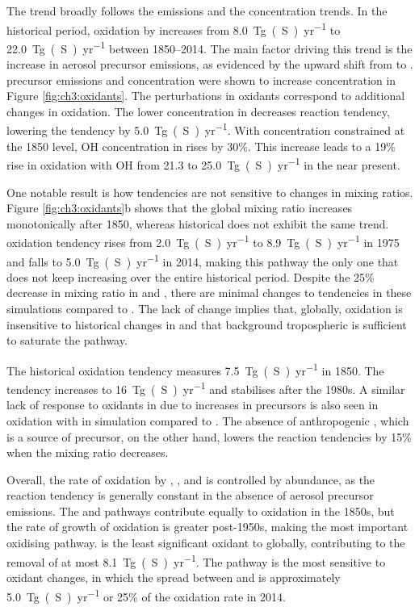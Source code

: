 The  trend broadly follows the  emissions and the  concentration trends. In the historical period,  oxidation by  increases from \qty{8.0}{Tg(S)~yr^{-1}} to \qty{22.0}{Tg(S)~yr^{-1}} between 1850--2014. The main factor driving this trend is the increase in aerosol precursor emissions, as evidenced by the upward shift from \sstpiaer{} to \histsst{}.  precursor emissions and  concentration were shown to increase  concentration in Figure \ref{fig:ch3:oxidants}. The perturbations in oxidants correspond to additional changes in oxidation. The lower  concentration in \sstpio{} decreases  reaction tendency, lowering the tendency by \qty{5.0}{Tg(S)~yr^{-1}}. With  concentration constrained at the 1850 level, OH concentration in \sstpich{} rises by 30\%. This increase leads to a 19\% rise in oxidation with OH from \num{21.3} to \qty{25.0}{Tg(S)~yr^{-1}} in the near present. 


One notable result is how  tendencies are not sensitive to changes in  mixing ratios. Figure \ref{fig:ch3:oxidants}b shows that the global  mixing ratio increases monotonically after 1850, whereas historical  does not exhibit the same trend.  oxidation tendency rises from \qty{2.0}{Tg(S)~yr^{-1}} to \qty{8.9}{Tg(S)~yr^{-1}} in 1975 and falls to \qty{5.0}{Tg(S)~yr^{-1}} in 2014, making this pathway the only one that does not keep increasing over the entire historical period. Despite the 25\% decrease in  mixing ratio in \sstpio{} and \sstpich{}, there are minimal changes to  tendencies in these simulations compared to \histsst{}. The lack of change implies that, globally,  oxidation is insensitive to historical changes in  and that background tropospheric  is sufficient to saturate the pathway. 


The historical  oxidation tendency measures \qty{7.5}{Tg(S)~yr^{-1}} in 1850. The tendency increases to \qty{16}{Tg(S)~yr^{-1}} and stabilises after the 1980s. A similar lack of response to oxidants in  due to increases in  precursors is also seen in  oxidation with  in \sstpio{} simulation compared to \histsst{}. The absence of anthropogenic , which is a source of  precursor, on the other hand, lowers the  reaction tendencies by 15\% when the  mixing ratio decreases. 


Overall, the rate of  oxidation by , , and  is controlled by  abundance, as the reaction tendency is generally constant in the absence of aerosol precursor emissions. The  and  pathways contribute equally to  oxidation in the 1850s, but the rate of growth of  oxidation is greater post-1950s, making  the most important oxidising pathway.  is the least significant oxidant to  globally, contributing to the removal of at most \qty{8.1}{Tg(S)~yr^{-1}}. The  pathway is the most sensitive to oxidant changes, in which the spread between \sstpio{} and \sstpich{} is approximately \qty{5.0}{Tg(S)~yr^{-1}} or 25\% of the \histsst{} oxidation rate in 2014.


